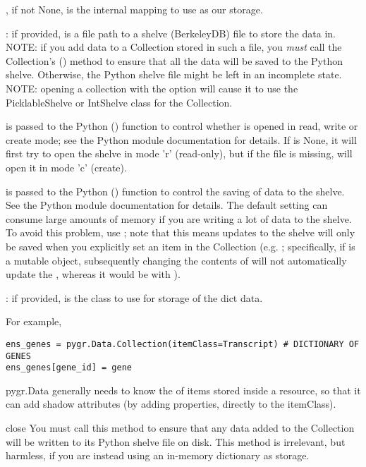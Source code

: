 \documentclass{howto}
\begin{document}
, if not None, is the internal mapping to use as our storage.

: if provided, is a file path to a shelve (BerkeleyDB) file to
  store the data in.  NOTE: if you add data to a Collection stored in such a file,
you {\em must} call the Collection's () method to ensure
that all the data will be saved to the Python shelve.  Otherwise, the 
Python shelve file might be left in an incomplete state.
NOTE: opening a collection with the  option will cause
it to use the PicklableShelve or IntShelve class for the Collection.

 is passed to the Python () function
to control whether  is opened in read, write or create mode;
see the Python  module documentation for details.  If 
is None, it will first try to open the shelve in mode 'r' (read-only),
but if the file is missing, will open it in mode 'c' (create).

 is passed to the Python () function
to control the saving of data to the shelve.  
See the Python  module documentation for details.
The default  setting can consume large amounts of
memory if you are writing a lot of data to the shelve.  To avoid
this problem, use ; note that this means updates
to the shelve will only be saved when you explicitly set an item
in the Collection (e.g. ; specifically, if
 is a mutable object, subsequently changing the contents of
 will not automatically update the , whereas
it would be with ).
   
: if provided, is the class to use for storage of the dict data.

For example,
\begin{verbatim}
ens_genes = pygr.Data.Collection(itemClass=Transcript) # DICTIONARY OF GENES
ens_genes[gene_id] = gene
\end{verbatim}
pygr.Data generally needs to know the  of items stored
inside a resource, so that it can add shadow attributes (by adding properties,
directly to the itemClass).

\begin{funcdesc}{close}{}
  You must call this method to ensure that any data added to the Collection
  will be written to its Python shelve file on disk.
  This method is irrelevant, but harmless,
  if you are instead using an in-memory dictionary as storage.
\end{funcdesc}
\end{document}
